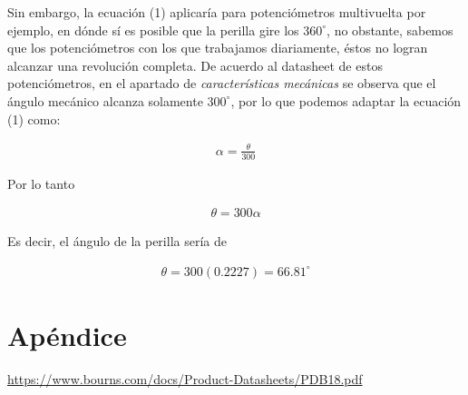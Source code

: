 \documentclass{article}
\begin{document}
	Sin embargo, la ecuación (1) aplicaría para potenciómetros multivuelta por ejemplo, en dónde sí es posible que la perilla gire los $360^{\circ}$, no obstante, sabemos que los potenciómetros con los que trabajamos diariamente, éstos no logran alcanzar una revolución completa. De acuerdo al datasheet de estos potenciómetros, en el apartado de \textit{características mecánicas} se observa que el ángulo mecánico alcanza solamente $300^{\circ}$, por lo que podemos adaptar la ecuación (1) como:
	
	\begin{align}
		\alpha = \frac{\theta}{300}
	\end{align}
	
	Por lo tanto
	
	\begin{align}
		\theta = 300 \alpha
	\end{align}
	
	Es decir, el ángulo de la perilla sería de
	
	\begin{align}
		\theta = 300(0.2227) = 66.81^{\circ} \nonumber
	\end{align}
	
	\section*{Apéndice}
	\url{https://www.bourns.com/docs/Product-Datasheets/PDB18.pdf}
	
\end{document}

